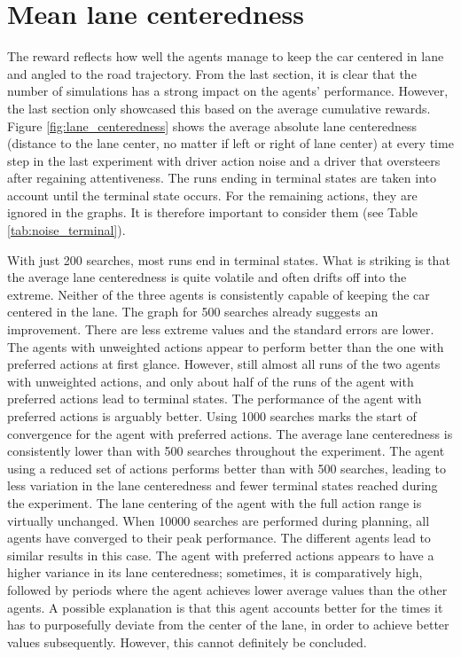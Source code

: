 \section{Mean lane centeredness}

The reward reflects how well the agents manage to keep the car centered in lane and angled to the road trajectory. From the last section, it is clear that the number of simulations has a strong impact on the agents' performance. However, the last section only showcased this based on the average cumulative rewards. Figure \ref{fig:lane_centeredness} shows the average absolute lane centeredness (distance to the lane center, no matter if left or right of lane center) at every time step in the last experiment with driver action noise and a driver that oversteers after regaining attentiveness. The runs ending in terminal states are taken into account until the terminal state occurs. For the remaining actions, they are ignored in the graphs. It is therefore important to consider them (see Table \ref{tab:noise_terminal}). 

With just 200 searches, most runs end in terminal states. What is striking is that the average lane centeredness is quite volatile and often drifts off into the extreme. Neither of the three agents is consistently capable of keeping the car centered in the lane. The graph for 500 searches already suggests an improvement. There are less extreme values and the standard errors are lower. The agents with unweighted actions appear to perform better than the one with preferred actions at first glance. However, still almost all runs of the two agents with unweighted actions, and only about half of the runs of the agent with preferred actions lead to terminal states. The performance of the agent with preferred actions is arguably better. Using 1000 searches marks the start of convergence for the agent with preferred actions. The average lane centeredness is consistently lower than with 500 searches throughout the experiment. The agent using a reduced set of actions performs better than with 500 searches, leading to less variation in the lane centeredness and fewer terminal states reached during the experiment. The lane centering of the agent with the full action range is virtually unchanged. When 10000 searches are performed during planning, all agents have converged to their peak performance. The different agents lead to similar results in this case. The agent with preferred actions appears to have a higher variance in its lane centeredness; sometimes, it is comparatively high, followed by periods where the agent achieves lower average values than the other agents. A possible explanation is that this agent accounts better for the times it has to purposefully deviate from the center of the lane, in order to achieve better values subsequently. However, this cannot definitely be concluded.





